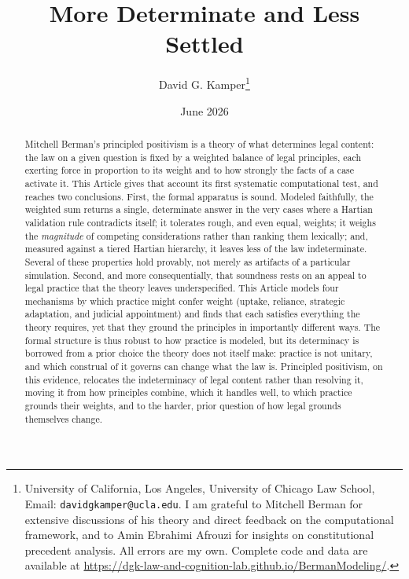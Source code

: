\documentclass[12pt]{article}
\title{
    \textbf{More Determinate and Less Settled}
}
\author{
    David G. Kamper\thanks{University of California, Los Angeles, University of Chicago Law School,
    Email: \texttt{davidgkamper@ucla.edu}.
    I am grateful to Mitchell Berman for extensive discussions of his
    theory and direct feedback on the computational framework,
    and to Amin Ebrahimi Afrouzi for insights on constitutional
    precedent analysis. All errors are my own.
    Complete code and data are available at
    \url{https://dgk-law-and-cognition-lab.github.io/BermanModeling/}.}
}
\date{June 2026}
\begin{document}
\maketitle


\begin{abstract}
\noindent
Mitchell Berman's principled positivism is a theory of what determines
legal content: the law on a given question is fixed by a weighted balance
of legal principles, each exerting force in proportion to its weight and
to how strongly the facts of a case activate it. This Article gives that
account its first systematic computational test, and reaches two
conclusions. First, the formal apparatus is sound. Modeled faithfully,
the weighted sum returns a single, determinate answer in the very
cases where a Hartian validation rule contradicts
itself; it tolerates rough, and even equal, weights; it weighs the
\emph{magnitude} of competing considerations rather than ranking them
lexically; and, measured against a tiered Hartian hierarchy, it leaves less of the law
indeterminate. Several of these properties hold provably,
not merely as artifacts of a particular simulation. Second, and more
consequentially, that soundness rests on an appeal to legal practice that
the theory leaves underspecified. This Article models four mechanisms by which
practice might confer weight (uptake, reliance, strategic adaptation,
and judicial appointment) and finds that each satisfies everything the
theory requires, yet that they ground the principles in importantly
different ways. The formal structure is thus robust to how practice is
modeled, but its determinacy is borrowed from a prior choice the theory
does not itself make: practice is not unitary, and which construal of it
governs can change what the law is. Principled positivism, on this
evidence, relocates the indeterminacy of legal content rather than
resolving it, moving it from how principles combine, which it handles
well, to which practice grounds their weights, and to the harder, prior question of
how legal grounds themselves change.
\end{abstract}

\newpage

\end{document}
